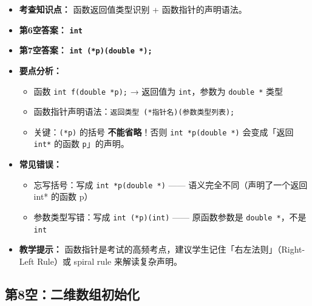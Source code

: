 \begin{itemize}
    \item \textbf{考查知识点：} 函数返回值类型识别 + 函数指针的声明语法。
    \item \textbf{第6空答案：} \texttt{\textbf{int}}
    \item \textbf{第7空答案：} \texttt{\textbf{int (*p)(double *);}}
    \item \textbf{要点分析：}
    \begin{itemize}
        \item 函数 \texttt{int f(double *p);} → 返回值为 \texttt{int}，参数为 \texttt{double *} 类型
        \item 函数指针声明语法：\texttt{返回类型 (*指针名)(参数类型列表);}
        \item 关键：\texttt{(*p)} 的括号 \textbf{不能省略}！否则 \texttt{int *p(double *)} 会变成「返回 \texttt{int*} 的函数 \texttt{p}」的声明。
    \end{itemize}
    \item \textbf{常见错误：}
    \begin{itemize}
        \item 忘写括号：写成 \texttt{int *p(double *)} —— 语义完全不同（声明了一个返回 int* 的函数 p）
        \item 参数类型写错：写成 \texttt{int (*p)(int)} —— 原函数参数是 \texttt{double *}，不是 \texttt{int}
    \end{itemize}
    \item \textbf{教学提示：} 函数指针是考试的高频考点，建议学生记住「右左法则」（Right-Left Rule）或 spiral rule 来解读复杂声明。
\end{itemize}

\subsection{第8空：二维数组初始化}

